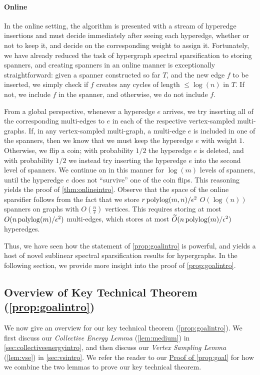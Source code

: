 \documentclass{article}
\begin{document}
\paragraph{Online} In the online setting, the algorithm is presented with a stream of hyperedge insertions and must decide immediately after seeing each hyperedge, whether or not to keep it, and decide on the corresponding weight to assign it. Fortunately, we have already reduced the task of hypergraph spectral sparsification to storing spanners, and creating spanners in an online manner is exceptionally straightforward: given a spanner constructed so far $T$, and the new edge $f$ to be inserted, we simply check if $f$ creates any cycles of length $\leq \log(n)$ in $T$. If not, we include $f$ in the spanner, and otherwise, we do not include $f$.

From a global perspective, whenever a hyperedge $e$ arrives, we try inserting all of the corresponding multi-edges to $e$ in each of the respective vertex-sampled multi-graphs. If, in any vertex-sampled multi-graph, a multi-edge $e$ is included in one of the spanners, then we know that we must keep the hyperedge $e$ with weight $1$. Otherwise, we flip a coin; with probability $1/2$ the hyperedge $e$ is deleted, and with probability $1/2$ we instead try inserting the hyperedge $e$ into the second level of spanners. We continue on in this manner for $\log(m)$ levels of spanners, until the hyperedge $e$ does not ``survive'' one of the coin flips. This reasoning yields the proof of \cref{thm:onlineintro}. Observe that the space of the online sparsifier follows from the fact that we store $r \operatorname{polylog}(m,n) / \epsilon^2$ $O(\log(n))$ spanners on graphs with $O(\frac{n}{r})$ vertices. This requires storing at most $O(n \operatorname{polylog}(m) / \epsilon^2)$ multi-edges, which stores at most $\widetilde{O}(n \operatorname{polylog}(m) / \epsilon^2)$ hyperedges. 

Thus, we have seen how the statement of \cref{prop:goalintro} is powerful, and yields a host of novel sublinear spectral sparsification results for hypergraphs. In the following section, we provide more insight into the proof of \cref{prop:goalintro}.

\subsection{Overview of Key Technical Theorem (\texorpdfstring{\cref{prop:goalintro})}{}}\label{sec:techOverviewAnalysis}

We now give an overview for our
key technical theorem (\cref{prop:goalintro}).
We first discuss our
\textit{Collective Energy Lemma} (\cref{lem:medium}) in \cref{sec:collectiveenergyintro},
and then discuss our
 \textit{Vertex Sampling Lemma} (\cref{lem:vse})
in
\cref{sec:vsintro}.
We refer the reader to our \hyperref[proof:thm1]{Proof of \cref*{prop:goal}}
for how we combine the two lemmas
to prove our key technical theorem.
\end{document}
